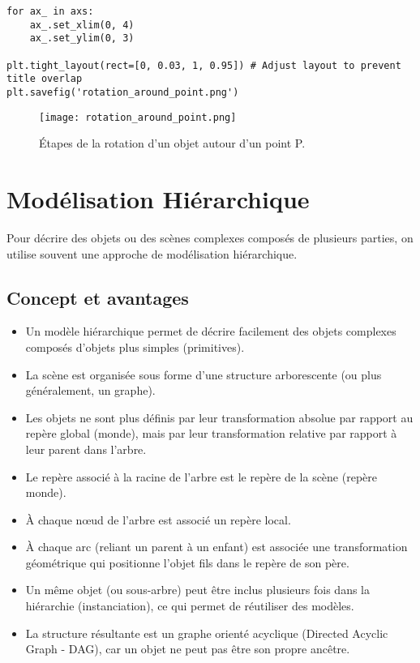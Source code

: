 \documentclass{article}
\begin{document}
\begin{verbatim}
for ax_ in axs:
    ax_.set_xlim(0, 4)
    ax_.set_ylim(0, 3)

plt.tight_layout(rect=[0, 0.03, 1, 0.95]) # Adjust layout to prevent title overlap
plt.savefig('rotation_around_point.png')
\end{verbatim}

\begin{figure}[H]
\centering
\texttt{[image: rotation\_around\_point.png]}
\caption{Étapes de la rotation d'un objet autour d'un point P.}
\label{fig:rotation_around_point}
\end{figure}

\section{Modélisation Hiérarchique}

Pour décrire des objets ou des scènes complexes composés de plusieurs parties, on utilise souvent une approche de modélisation hiérarchique.

\subsection{Concept et avantages}
\begin{itemize}
    \item Un modèle hiérarchique permet de décrire facilement des objets complexes composés d'objets plus simples (primitives).
    \item La scène est organisée sous forme d'une structure arborescente (ou plus généralement, un graphe).
    \item Les objets ne sont plus définis par leur transformation absolue par rapport au repère global (monde), mais par leur transformation relative par rapport à leur parent dans l'arbre.
    \item Le repère associé à la racine de l'arbre est le repère de la scène (repère monde).
    \item À chaque nœud de l'arbre est associé un repère local.
    \item À chaque arc (reliant un parent à un enfant) est associée une transformation géométrique qui positionne l'objet fils dans le repère de son père.
    \item Un même objet (ou sous-arbre) peut être inclus plusieurs fois dans la hiérarchie (instanciation), ce qui permet de réutiliser des modèles.
    \item La structure résultante est un graphe orienté acyclique (Directed Acyclic Graph - DAG), car un objet ne peut pas être son propre ancêtre.
\end{itemize}
\end{document}
